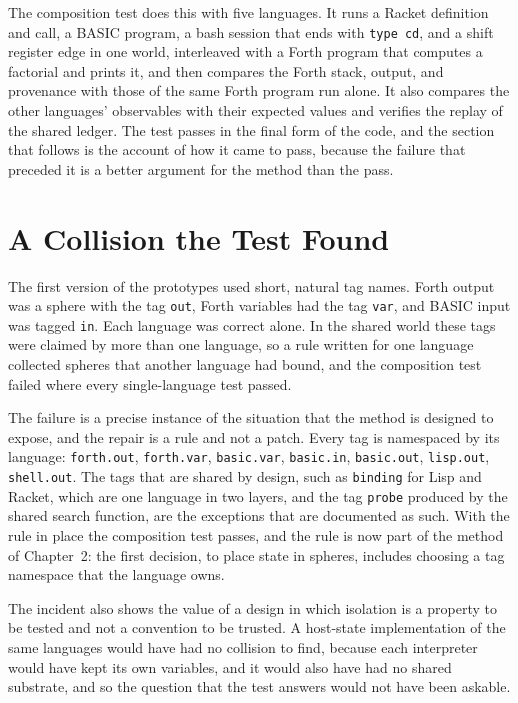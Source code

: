 \documentclass[11pt,oneside]{report}
\theoremstyle{plain}
\theoremstyle{definition}
\theoremstyle{remark}
\begin{document}
The composition test does this with five languages. It runs a Racket definition and call, a BASIC program, a bash session that ends with \texttt{type cd}, and a shift register edge in one world, interleaved with a Forth program that computes a factorial and prints it, and then compares the Forth stack, output, and provenance with those of the same Forth program run alone. It also compares the other languages' observables with their expected values and verifies the replay of the shared ledger. The test passes in the final form of the code, and the section that follows is the account of how it came to pass, because the failure that preceded it is a better argument for the method than the pass.

\section{A Collision the Test Found}

The first version of the prototypes used short, natural tag names. Forth output was a sphere with the tag \texttt{out}, Forth variables had the tag \texttt{var}, and BASIC input was tagged \texttt{in}. Each language was correct alone. In the shared world these tags were claimed by more than one language, so a rule written for one language collected spheres that another language had bound, and the composition test failed where every single-language test passed.

The failure is a precise instance of the situation that the method is designed to expose, and the repair is a rule and not a patch. Every tag is namespaced by its language: \texttt{forth.out}, \texttt{forth.var}, \texttt{basic.var}, \texttt{basic.in}, \texttt{basic.out}, \texttt{lisp.out}, \texttt{shell.out}. The tags that are shared by design, such as \texttt{binding} for Lisp and Racket, which are one language in two layers, and the tag \texttt{probe} produced by the shared search function, are the exceptions that are documented as such. With the rule in place the composition test passes, and the rule is now part of the method of Chapter~2: the first decision, to place state in spheres, includes choosing a tag namespace that the language owns.

The incident also shows the value of a design in which isolation is a property to be tested and not a convention to be trusted. A host-state implementation of the same languages would have had no collision to find, because each interpreter would have kept its own variables, and it would also have had no shared substrate, and so the question that the test answers would not have been askable.
\end{document}
